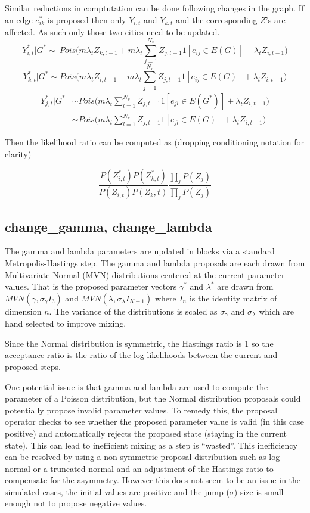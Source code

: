 \documentclass[]{article}
\numberwithin{equation}{section}
\begin{document}
Similar reductions in comptutation can be done following changes in the
graph. If an edge \(e^*_{ik}\) is proposed then only \(Y_{i,t}\) and
\(Y_{k,t}\) and the corresponding \(Z\)'s are affected. As such only
those two cities need to be updated.
\[Y^*_{i,t}|G^* \sim ~ Pois\big(m\lambda_tZ_{k,t-1} +m\lambda_t\sum_{j=1}^{N_v}Z_{j,t-1}1[e_{ij}\in E(G)]+ \lambda_tZ_{i,t-1}\big) \]
\[Y^*_{k,t}|G^* \sim  Pois\big(m\lambda_tZ_{i,t-1} +m\lambda_t\sum_{j=1}^{N_v}Z_{j,t-1}1[e_{ij}\in E(G)]+ \lambda_tZ_{i,t-1}\big) \]
\[\begin{aligned} Y^*_{j,t}|G^* &\sim Pois\big(m\lambda_t\sum_{l=1}^{N_v}Z_{j,t-1}1[e_{jl}\in E(G^*)]+ \lambda_tZ_{i,t-1}\big)\\ & \sim  Pois\big(m\lambda_t\sum_{l=1}^{N_v}Z_{j,t-1}1[e_{jl}\in E(G)]+ \lambda_tZ_{i,t-1}\big) \end{aligned}\]

Then the likelihood ratio can be computed as (dropping conditioning
notation for clarity)

\[ \frac{P(Z^*_{i,t})P(Z^*_{k,t})}{P(Z_{i,t})P(Z_k,t)}\frac{\prod_j P(Z_{j})}{\prod_{j}P( Z_{j})} \]

\hypertarget{change_gamma-change_lambda}{%
\subsection{change\_gamma,
change\_lambda}\label{change_gamma-change_lambda}}

The gamma and lambda parameters are updated in blocks via a standard
Metropolis-Hastings step. The gamma and lambda proposals are each drawn
from Multivariate Normal (MVN) distributions centered at the current
parameter values. That is the proposed parameter vectors \(\gamma^*\)
and \(\lambda^*\) are drawn from \(MVN(\gamma, \sigma_\gamma I_3)\) and
\(MVN(\lambda, \sigma_\lambda I_{K+1})\) where \(I_n\) is the identity
matrix of dimension \(n\). The variance of the distributions is scaled
as \(\sigma_\gamma\) and \(\sigma_\lambda\) which are hand selected to
improve mixing.

Since the Normal distribution is symmetric, the Hastings ratio is 1 so
the acceptance ratio is the ratio of the log-likelihoods between the
current and proposed steps.

One potential issue is that gamma and lambda are used to compute the
parameter of a Poisson distribution, but the Normal distribution
proposals could potentially propose invalid parameter values. To remedy
this, the proposal operator checks to see whether the proposed parameter
value is valid (in this case positive) and automatically rejects the
proposed state (staying in the current state). This can lead to
inefficient mixing as a step is ``wasted''. This inefficiency can be
resolved by using a non-symmetric proposal distribution such as
log-normal or a truncated normal and an adjustment of the Hastings ratio
to compensate for the asymmetry. However this does not seem to be an
issue in the simulated cases, the initial values are positive and the
jump (\(\sigma\)) size is small enough not to propose negative values.
\end{document}
